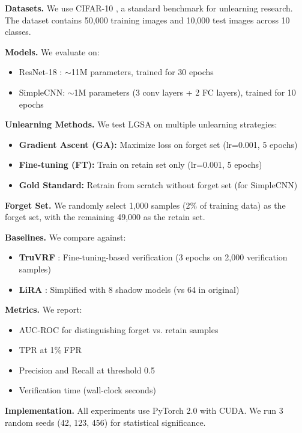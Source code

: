 \documentclass{article}
\begin{document}
\textbf{Datasets.} We use CIFAR-10 \cite{krizhevsky2009learning}, a standard benchmark for unlearning research. The dataset contains 50,000 training images and 10,000 test images across 10 classes.

\textbf{Models.} We evaluate on:
\begin{itemize}
    \item ResNet-18 \cite{he2016deep}: $\sim$11M parameters, trained for 30 epochs
    \item SimpleCNN: $\sim$1M parameters (3 conv layers + 2 FC layers), trained for 10 epochs
\end{itemize}

\textbf{Unlearning Methods.} We test LGSA on multiple unlearning strategies:
\begin{itemize}
    \item \textbf{Gradient Ascent (GA):} Maximize loss on forget set (lr=0.001, 5 epochs)
    \item \textbf{Fine-tuning (FT):} Train on retain set only (lr=0.001, 5 epochs)
    \item \textbf{Gold Standard:} Retrain from scratch without forget set (for SimpleCNN)
\end{itemize}

\textbf{Forget Set.} We randomly select 1,000 samples (2\% of training data) as the forget set, with the remaining 49,000 as the retain set.

\textbf{Baselines.} We compare against:
\begin{itemize}
    \item \textbf{TruVRF} \cite{zhou2024truvrf}: Fine-tuning-based verification (3 epochs on 2,000 verification samples)
    \item \textbf{LiRA} \cite{carlini2022membership}: Simplified with 8 shadow models (vs 64 in original)
\end{itemize}

\textbf{Metrics.} We report:
\begin{itemize}
    \item AUC-ROC for distinguishing forget vs. retain samples
    \item TPR at 1\% FPR
    \item Precision and Recall at threshold 0.5
    \item Verification time (wall-clock seconds)
\end{itemize}

\textbf{Implementation.} All experiments use PyTorch 2.0 with CUDA. We run 3 random seeds (42, 123, 456) for statistical significance.
\end{document}
